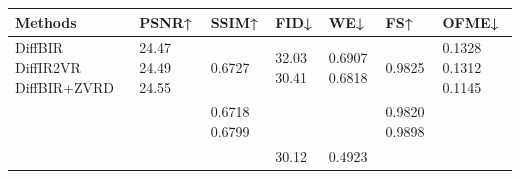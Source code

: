\begin{tabular}{lllllll}
\toprule
Methods & PSNR↑ & SSIM↑ & FID↓ & WE↓ & FS↑ & OFME↓ \\
\midrule
DiffBIR DiffIR2VR DiffBIR+ZVRD & 24.47 24.49 24.55 & 0.6727 & 32.03 30.41 & 0.6907 0.6818 & 0.9825 & 0.1328 0.1312 0.1145 \\
 &  & 0.6718 0.6799 &  &  & 0.9820 0.9898 &  \\
 &  &  & 30.12 & 0.4923 &  &  \\
\bottomrule
\end{tabular}
